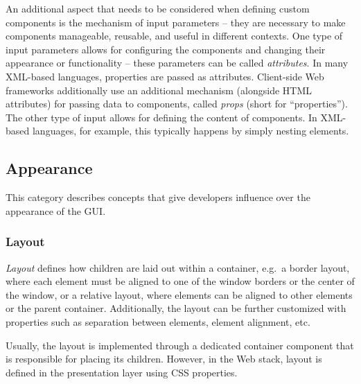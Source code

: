 An additional aspect that needs to be considered when defining custom components is the mechanism of input parameters -- they are necessary to make components manageable, reusable, and useful in different contexts.
One type of input parameters allows for configuring the components and changing their appearance or functionality -- these parameters can be called \emph{attributes}.
In many XML-based languages, properties are passed as attributes.
Client-side Web frameworks additionally use an additional mechanism (alongside HTML attributes) for passing data to components, called \emph{props} (short for \enquote{properties}).
The other type of input allows for defining the content of components.
In XML-based languages, for example, this typically happens by simply nesting elements.

\subsection{Appearance}\label{subsec:appearance}
This category describes concepts that give developers influence over the appearance of the GUI\@.

\subsubsection{Layout}
\emph{Layout} defines how children are laid out within a container, e.g.\ a border layout, where each element must be aligned to one of the window borders or the center of the window, or a relative layout, where elements can be aligned to other elements or the parent container.
Additionally, the layout can be further customized with properties such as separation between elements, element alignment, etc.

Usually, the layout is implemented through a dedicated container component that is responsible for placing its children.
However, in the Web stack, layout is defined in the presentation layer using CSS properties.

